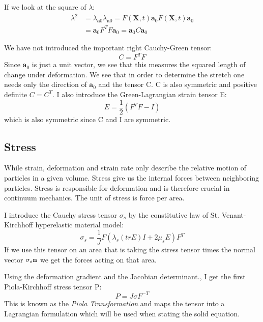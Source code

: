 If we look at the square of $\lambda$:
\begin{align}
\lambda^2 &=  \lambda_{\textbf{a}0} \lambda_{\textbf{a}0} = F(\textbf{X},t)\textbf{a}_0 F(\textbf{X},t)\textbf{a}_0 \\
&= \textbf{a}_0 F^TF\textbf{a}_0 = \textbf{a}_0 C \textbf{a}_0
\end{align}

We have not introduced the important right Cauchy-Green tensor:
 \begin{equation}
 C = F^TF
\end{equation}
Since $\textbf{a}_0 $ is just a unit vector, we see that this measures the squared length of change under deformation. We see that in order to determine the stretch one needs only the direction of $\textbf{a}_0$ and the tensor C.
C is also symmetric and positive definite $C = C^T$.  I also introduce the Green-Lagrangian strain tensor E:
\begin{equation}\label{eq:StrainTensor}
E = \frac{1}{2}(F^TF -I) 
\end{equation}
which is also symmetric since C and I are symmetric. 
		
\subsection{Stress}
While strain, deformation and strain rate only describe the relative motion of particles in a given volume. Stress give us the internal forces between neighboring particles. Stress is responsible for deformation and is therefore crucial in continuum mechanics. The unit of stress is force per area.

I introduce the Cauchy stress tensor $\sigma_s$ by the constitutive law of St. Venant-Kirchhoff hyperelastic material model:
\begin{equation}
 \sigma_s = \frac{1}{J} F(\lambda_s (tr E)I + 2\mu_sE) F^T
\end{equation}
If we use this tensor on an area that is taking the stress tensor times the normal vector $\sigma_s \bold{n}$ we get the forces acting on that area.

Using the deformation gradient and the Jacobian determinant., I get the first Piola-Kirchhoff stress tensor P:
\begin{equation}
 P = J \sigma F^{-T} 
\end{equation}
This is known as the \textit{Piola Transformation} and maps the tensor into a Lagrangian formulation which will be used when stating the solid equation.

